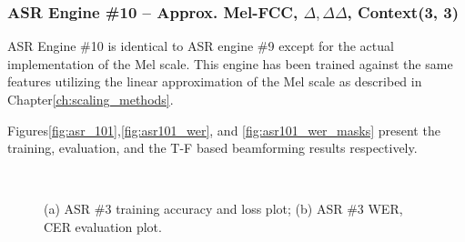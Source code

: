 \subsubsection{ASR Engine \#10 -- Approx. Mel-FCC, \(\Delta,\Delta\Delta\), Context(3, 3)}
ASR Engine \#10 is identical to ASR engine \#9 except for the
actual implementation of the Mel scale. This engine has been
trained against the same features 
utilizing 
the linear approximation of the Mel scale
as described in Chapter\;\ref{ch:scaling_methods}.

\bigskip

Figures\;\ref{fig:asr_101},\;\ref{fig:asr101_wer}, 
and \ref{fig:asr101_wer_masks}
present the training, evaluation, and the 
T-F based beamforming results respectively. 

\begin{figure}[H]
    \centering
    \\
    \vspace{-0.3cm}
    \caption{(a) ASR \#3 training accuracy and loss plot;\;\;
        (b) ASR \#3 WER, CER evaluation plot.}\label{fig:asr101_wer_subplot} 
\end{figure}

